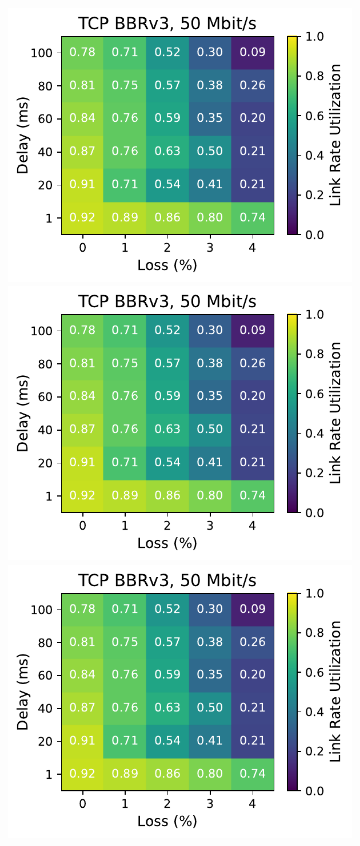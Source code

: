 \begin{figure}[ht]
\begin{subfigure}[b]{0.89cm}
        \includegraphics[width=\linewidth,trim={8cm 0 0 0},clip]{splitting/figures/heatmaps/heatmap_tcp_bbr3_50mbps.pdf}
        \includegraphics[width=\linewidth,trim={8cm 0 0 0},clip]{splitting/figures/heatmaps/heatmap_tcp_bbr3_50mbps.pdf}
        \includegraphics[width=\linewidth,trim={8cm 0 0 0},clip]{splitting/figures/heatmaps/heatmap_tcp_bbr3_50mbps.pdf}

\end{subfigure}
\end{figure}
